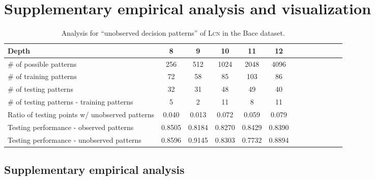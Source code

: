 \documentclass{article} \usepackage{iclr2020_conference,times}
\begin{document}
\vspace{-1mm}
\section{Supplementary empirical analysis and visualization}\label{appendix:exp:analysis}
\vspace{-1mm}

\begin{table}[t]
  \vspace{-2mm}
  \caption{Analysis for ``unobserved decision patterns'' of \textsc{Lcn} in the Bace dataset.}\label{tab:appendix:analysis}
  \vspace{-2mm}
  \centering
  \begin{tabular}{lcccccccccccc}
    \toprule
    \small Depth                                            & \small 8      & \small 9      & \small 10     & \small 11     & \small 12\\ \midrule
    \small \# of possible patterns                          & \small 256    & \small 512    & \small 1024   & \small 2048   & \small 4096\\ \small \# of training patterns                          & \small  72    & \small  58    & \small   85   & \small  103   & \small 86\\
    \small \# of testing patterns                           & \small  32    & \small 31     & \small  48    & \small 49     & \small 40 \\
    \small \# of testing patterns - training patterns       & \small  5     & \small  2     & \small  11    & \small 8      & \small 11 \\
    \small Ratio of testing points w/ unobserved patterns   & \small 0.040  & \small 0.013  & \small 0.072  & \small 0.059  & \small 0.079 \\
    \midrule
    \small Testing performance - observed patterns          & \small 0.8505 & \small 0.8184 & \small 0.8270 & \small 0.8429 & \small 0.8390\\
    \small Testing performance - unobserved patterns        & \small 0.8596 & \small 0.9145 & \small 0.8303 & \small 0.7732 & \small 0.8894\\
    \bottomrule
  \end{tabular}
  \vspace{-5mm}
\end{table}


\subsection{Supplementary empirical analysis}
\end{document}
